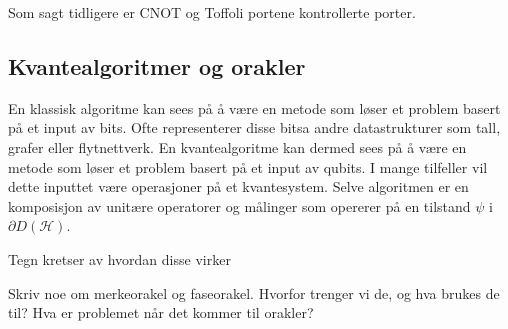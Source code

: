         Som sagt tidligere er CNOT og Toffoli portene kontrollerte porter. 

\subsection{Kvantealgoritmer og orakler}

        En klassisk algoritme kan sees på å være en metode som løser et problem basert på et input av bits. Ofte representerer disse bitsa andre datastrukturer som tall, grafer eller flytnettverk. En kvantealgoritme kan dermed sees på å være en metode som løser et problem basert på et input av qubits. I mange tilfeller vil dette inputtet være operasjoner på et kvantesystem. Selve algoritmen er en komposisjon av unitære operatorer og målinger som opererer på en tilstand $\psi$ i $\partial D(\mathcal{H})$. 
        
        {Tegn kretser av hvordan disse virker}

        Skriv noe om merkeorakel og faseorakel. Hvorfor trenger vi de, og hva brukes de til? Hva er problemet når det kommer til orakler?